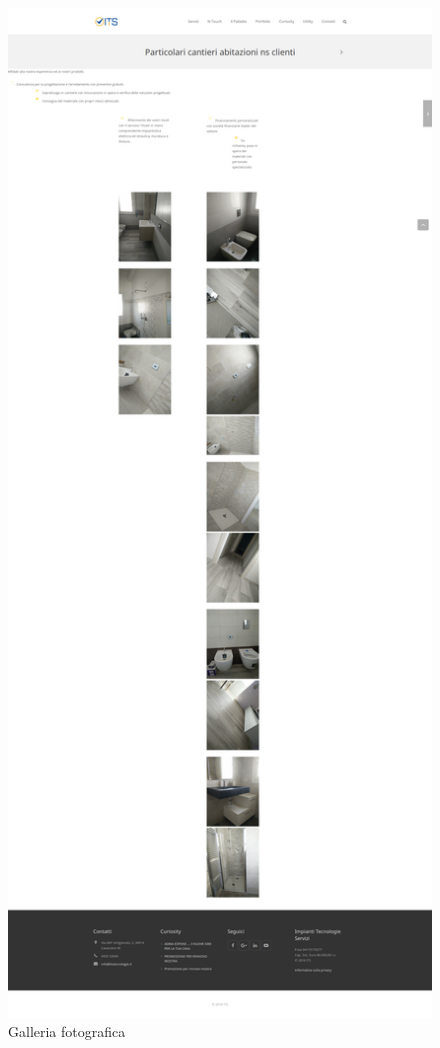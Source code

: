 \begin{figure}[H]
	\centering
	\includegraphics[width=\textwidth,height=\textheight,keepaspectratio]{img/Galleria.png}
	\caption{Galleria fotografica}\label{Galleria}
\end{figure}

